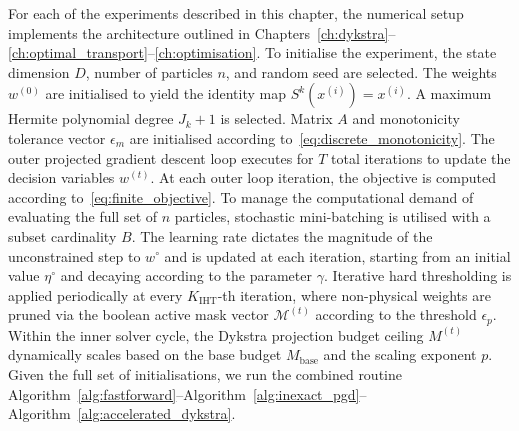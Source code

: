 For each of the experiments described in this chapter, the numerical setup implements the architecture outlined in Chapters~\ref{ch:dykstra}--\ref{ch:optimal_transport}--\ref{ch:optimisation}. To initialise the experiment, the state dimension $D$, number of particles $n$, and random seed are selected. The weights $w^{(0)}$ are initialised to yield the identity map $S^k(x^{(i)}) = x^{(i)}$. A maximum Hermite polynomial degree $J_k + 1$ is selected. Matrix $A$ and monotonicity tolerance vector $\epsilon_m$ are initialised according to~\eqref{eq:discrete_monotonicity}. The outer projected gradient descent loop executes for $T$ total iterations to update the decision variables $w^{(t)}$. At each outer loop iteration, the objective is computed according to~\eqref{eq:finite_objective}. To manage the computational demand of evaluating the full set of $n$ particles, stochastic mini-batching is utilised with a subset cardinality $B$. The learning rate dictates the magnitude of the unconstrained step to $w^\circ$ and is updated at each iteration, starting from an initial value $\eta^\circ$ and decaying according to the parameter $\gamma$. Iterative hard thresholding is applied periodically at every $K_{\mathrm{IHT}}$-th iteration, where non-physical weights are pruned via the boolean active mask vector $\mathcal{M}^{(t)}$ according to the threshold $\epsilon_p$. Within the inner solver cycle, the Dykstra projection budget ceiling $M^{(t)}$ dynamically scales based on the base budget $M_{\mathrm{base}}$ and the scaling exponent $p$. Given the full set of initialisations, we run the combined routine Algorithm~\ref{alg:fastforward}--Algorithm~\ref{alg:inexact_pgd}--Algorithm~\ref{alg:accelerated_dykstra}.